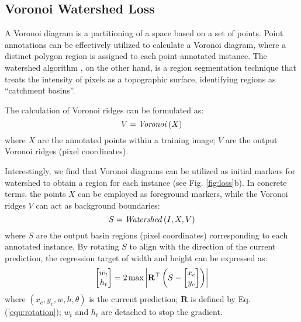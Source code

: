 \subsection{Voronoi Watershed Loss}
\label{sec:method-lw}

A Voronoi diagram \cite{aurenhammer1991voronoi} is a partitioning of a space based on a set of points. Point annotations can be effectively utilized to calculate a Voronoi diagram, where a distinct polygon region is assigned to each point-annotated instance. The watershed algorithm \cite{vincent1991watersheds}, on the other hand, is a region segmentation technique that treats the intensity of pixels as a topographic surface, identifying regions as ``catchment basins''.

The calculation of Voronoi ridges can be formulated as:
\begin{equation} \setlength\abovedisplayskip{6pt} \setlength\belowdisplayskip{6pt}
V = \mathit{Voronoi} \left (X \right ) 
\end{equation}
where $X$ are the annotated points within a training image; $V$ are the output Voronoi ridges (pixel coordinates).

Interestingly, we find that Voronoi diagrams can be utilized as initial markers for watershed to obtain a region for each instance (see Fig. \ref{fig:loss}b). In concrete terms, the points $X$ can be employed as foreground markers, while the Voronoi ridges $V$ can act as background boundaries:
\begin{equation} \setlength\abovedisplayskip{6pt} \setlength\belowdisplayskip{6pt}
S = \mathit{Watershed} \left (I, X, V \right ) 
\end{equation}
where $S$ are the output basin regions (pixel coordinates) corresponding to each annotated instance.
By rotating $S$ to align with the direction of the current prediction, the regression target of width and height can be expressed as:
\begin{equation} \setlength\abovedisplayskip{6pt} \setlength\belowdisplayskip{6pt}
\begin{bmatrix}
w_t \\
h_t
\end{bmatrix} = 2\max \left |  \mathbf{R}^\top
\left ( S- \begin{bmatrix}
x_c \\
y_c
\end{bmatrix} \right )  \right | 
\end{equation}
where $\left(
 x_c, y_c, w, h, \theta
\right)$ is the current prediction; $\mathbf{R}$ is defined by Eq. (\ref{equ:rotation}); $w_t$ and $h_t$ are detached to stop the gradient.

